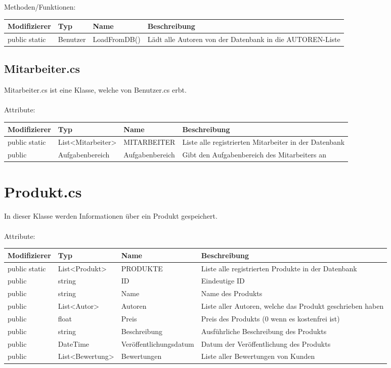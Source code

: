 Methoden/Funktionen:\\

\begin{tabular}[h]{l|l|p{6cm}|p{6cm}}
Modifizierer & Typ & Name & Beschreibung\\
\hline
public static & Benutzer & LoadFromDB() & Lädt alle Autoren von der Datenbank in die AUTOREN-Liste\\
\end{tabular}


\subsection{Mitarbeiter.cs}
Mitarbeiter.cs ist eine Klasse, welche von Benutzer.cs erbt.\\
\\
Attribute:\\

\begin{tabular}[h]{l|l|l|p{8cm}}
Modifizierer & Typ & Name & Beschreibung\\
\hline
public static & List<Mitarbeiter> & MITARBEITER & Liste alle registrierten Mitarbeiter in der Datenbank\\
\hline
public & Aufgabenbereich & Aufgabenbereich & Gibt den Aufgabenbereich des Mitarbeiters an\\
\end{tabular}\newline \break

\newpage

\section{Produkt.cs}
In dieser Klasse werden Informationen über ein Produkt gespeichert.\\
\\

Attribute:\\

\begin{tabular}[h]{l|l|l|p{6.3cm}}
Modifizierer & Typ & Name & Beschreibung\\
\hline
public static & List<Produkt> & PRODUKTE & Liste alle registrierten Produkte in der Datenbank\\
\hline
public & string & ID & Eindeutige ID\\
\hline
public & string & Name & Name des Produkts\\
\hline
public & List<Autor> & Autoren & Liste aller Autoren, welche das Produkt geschrieben haben\\
\hline
public & float & Preis & Preis des Produkts (0 wenn es kostenfrei ist)\\
\hline
public & string & Beschreibung & Ausführliche Beschreibung des Produkts\\
\hline
public & DateTime & Veröffentlichungsdatum & Datum der Veröffentlichung des Produkts\\
\hline
public & List<Bewertung> & Bewertungen & Liste aller Bewertungen von Kunden\\
\end{tabular}\\\\

